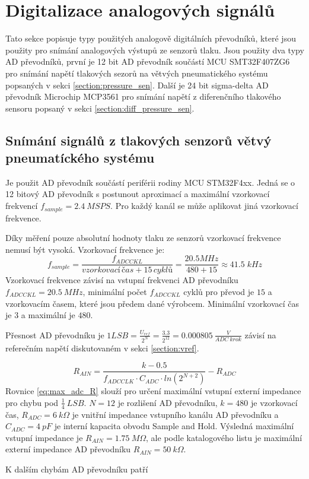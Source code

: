\section{Digitalizace analogových signálů}
Tato sekce popisuje typy použitých analogově digitálních převodníků, které jsou použity pro snímání analogových výstupů ze senzorů tlaku. Jsou použity dva typy AD převodníků, první je 12 bit AD převodník součástí MCU SMT32F407ZG6 pro snímání napětí tlakových sezorů na větvých pneumatického systému popsaných v sekci \ref{section:pressure_sen}.
Další je 24 bit sigma-delta AD převodník Microchip MCP3561 pro snímání napětí z diferenčního tlakového sensoru popsaný v sekci \ref{section:diff_pressure_sen}.

\subsection{Snímání signálů z tlakových senzorů větvý pneumatíckého systému}
Je použit AD převodník součástí periférii rodiny MCU STM32F4xx. Jedná se o 12 bitový AD převodník s postunout aproximací a maximální vzorkovací frekvencí $f_{sample} = 2.4 \ MSPS$. Pro každý kanál se může aplikovat jiná vzorkovací frekvence. \par
Díky měření pouze absolutní hodnoty tlaku ze senzorů vzorkovací frekvence nemusí být vysoká. Vzorkovací frekvence je:
\begin{equation}
    f_{sample}=\frac{f_{ADCCKL}}{vzorkovací \, čas + 15 \, cyklů } = \frac{20.5 \! MHz}{480 + 15} \approx 41.5 \; kHz
\end{equation}
Vzorkovací frekvence závisí na vstupní frekvenci AD převodníku $f_{ADCCKL} = 20.5 \ MHz$, minimální počet $f_{ADCCKL} $ cyklů pro převod je $15$ a vzorkovacím časem, které jsou předem dané výrobcem. Minimální vzorkovací čas je $3$ a maximální je $480$.
\par
Přesnost AD převodníku je $1 LSB = \frac{U_{ref}}{2^N} = \frac{3.3}{2^{12}} = 0.000805 \ \frac{V}{ADC \ krok}$ závisí na referečním napětí diskutovaném v sekci \ref{section:vref}.

\begin{equation} \label{eq:max_adc_R}
    R_{AIN} = \frac{k - 0.5}{f_{ADCCLK} \cdot C_{ADC} \cdot ln(2^{N+2})} - R_{ADC}
\end{equation}
Rovnice \ref{eq:max_adc_R} slouží pro určení maximální vstupní externí impedance pro chybu pod $\frac{1}{4} \ LSB$. $N = 12$ je rozlišení AD převodníku, $k = 480$ je vzorkovací čas, $R_{ADC} = 6 \ k\Omega$ je vnitřní impedance vstupního kanálu AD převodníku a
$C_{ADC} = 4 \ pF$ je interní kapacita obvodu Sample and Hold. Výsledná maximální vstupní impedance je $R_{AIN} = 1.75 \ M\Omega$, ale podle katalogového listu je maximální externí impedance AD převodníku $R_{AIN} = 50 \ k\Omega$.
\par
K dalším chybám AD převodníku patří

